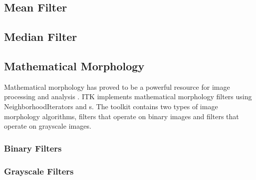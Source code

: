 \subsection{Mean Filter}
\label{sec:MeanFilter}

\ifitkFullVersion

\fi

\subsection{Median Filter}
\label{sec:MedianFilter}

\ifitkFullVersion

\fi


\subsection{Mathematical Morphology}
\label{sec:MathematicalMorphology}

Mathematical morphology has proved to be a powerful resource for image
processing and analysis \cite{Serra1982}. ITK implements mathematical
morphology filters using NeighborhoodIterators and
s.  The toolkit contains two types of image
morphology algorithms, filters that operate on binary images and filters that
operate on grayscale images.

\subsubsection{Binary Filters}
\label{sec:MathematicalMorphologyBinaryFilters}

\ifitkFullVersion

\fi


\subsubsection{Grayscale Filters}
\label{sec:MathematicalMorphologyGrayscaleFilters}

\ifitkFullVersion

\fi




